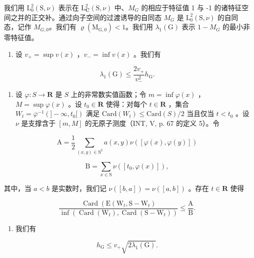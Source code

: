 我们用 \(\mathrm{L}_{0}^{2}(\mathrm{S},\nu)\) 表示在 \(\mathrm{L}_{\mathbf{C}}^{2}(\mathrm{S},\nu)\) 中、\(M_{G}\) 的相应于特征值 1 与 -1 的诸特征空间之并的正交补。通过向子空间的过渡诱导的自同态 \(M_{G}\) 是 \(\mathrm{L}_{0}^{2}(\mathrm{S},\nu)\) 的自同态，记作 \(M_{G,0}\)。我们有 \(\varrho(\mathrm{M}_{\mathrm{G},0}) < 1\)。我们用 \(\lambda_{1}(\mathrm{G})\) 表示 \(1 - M_{G}\) 的最小非零特征值。

\begin{enumerate}
\def\labelenumi{\alph{enumi})}
\setcounter{enumi}{1}
\tightlist
\item
  设 \(v_{+} = \sup v(x)\) ，\(v_{-} = \inf v(x)\) 。我们有
\end{enumerate}

\[
\lambda_ {1} (\mathrm{G}) \leqslant \frac {2 v _ {+}}{v _ {-} ^ {2}} h _ {\mathrm{G}}.
\]

\begin{enumerate}
\def\labelenumi{\alph{enumi})}
\setcounter{enumi}{2}
\tightlist
\item
  设 \(\varphi\colon S\to\mathbf{R}\) 是 \(S\) 上的非常数实值函数；令 \(m=\inf\varphi(x)\) ，\(M=\sup\varphi(x)\) 。设 \(t_{0}\in\mathbf{R}\) 使得：对每个 \(t\in\mathbf{R}\) ，集合 \(W_{t}=\overline{\varphi}^{-1}(]-\infty,t_{0}[)\) 满足 \(\mathrm{Card}(W_{t})\leqslant\mathrm{Card}(S)/2\) 当且仅当 \(t<t_{0}\) 。设 \(\nu\) 是支撑含于 \([m,M]\) 的无原子测度（INT, V, p. 67 的定义 5）。令
\end{enumerate}

\[
\mathrm{A} = \frac {1}{2} \sum_ {(x, y) \in \mathrm{S} ^ {2}} a (x, y) \nu ([ \varphi (x), \varphi (y) ])
\]

\[
\mathrm{B} = \sum_ {x \in \mathrm{S}} \nu ([ t _ {0}, \varphi (x) ]),
\]

其中，当 \(a < b\) 是实数时，我们记 \(\nu([b, a]) = \nu([a, b])\) 。存在 \(t \in \mathbf{R}\) 使得

\[
\frac {\operatorname{Card} \left(\mathrm{E} \left(\mathrm{W} _ {t} , \mathrm{S} - \mathrm{W} _ {t}\right) \right.}{\inf \left(\operatorname{Card} \left(\mathrm{W} _ {t}\right) , \operatorname{Card} \left(\mathrm{S} - \mathrm{W} _ {t}\right)\right)} \leqslant \frac {\mathrm{A}}{\mathrm{B}}.
\]

\begin{enumerate}
\def\labelenumi{\alph{enumi})}
\setcounter{enumi}{3}
\tightlist
\item
  我们有
\end{enumerate}

\[
h _ {\mathrm{G}} \leqslant v _ {+} \sqrt {2 \lambda_ {1} (\mathrm{G})}.
\]

